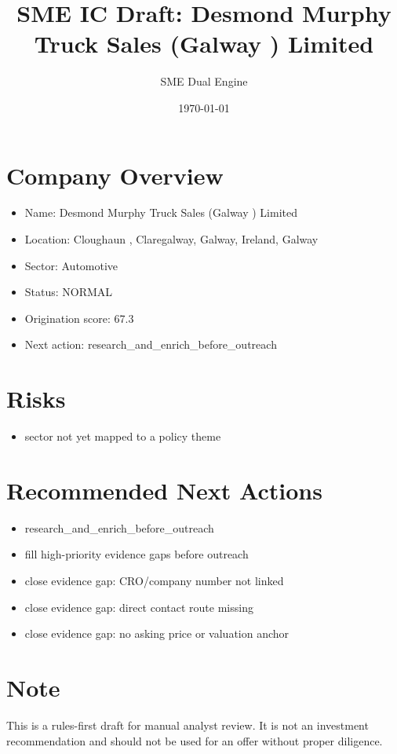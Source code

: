 \documentclass[11pt,a4paper]{article}
\title{SME IC Draft: Desmond Murphy Truck Sales (Galway ) Limited}
\author{SME Dual Engine}
\date{\today}
\begin{document}
\maketitle
\section*{Company Overview}
\begin{itemize}[leftmargin=1.4em]
\item Name: Desmond Murphy Truck Sales (Galway ) Limited
\item Location: Cloughaun , Claregalway, Galway, Ireland, Galway
\item Sector: Automotive
\item Status: NORMAL
\item Origination score: 67.3
\item Next action: research\_and\_enrich\_before\_outreach
\end{itemize}
\section*{Risks}
\begin{itemize}[leftmargin=1.4em]
\item sector not yet mapped to a policy theme
\end{itemize}
\section*{Recommended Next Actions}
\begin{itemize}[leftmargin=1.4em]
\item research\_and\_enrich\_before\_outreach
\item fill high-priority evidence gaps before outreach
\item close evidence gap: CRO/company number not linked
\item close evidence gap: direct contact route missing
\item close evidence gap: no asking price or valuation anchor
\end{itemize}
\section*{Note}
This is a rules-first draft for manual analyst review. It is not an investment
recommendation and should not be used for an offer without proper diligence.
\end{document}
